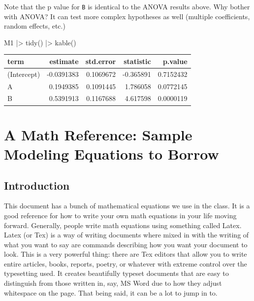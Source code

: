 \documentclass[
  letterpaper,
  DIV=11,
  numbers=noendperiod]{scrreprt}
\newenvironment{Shaded}{\begin{snugshade}}{\end{snugshade}}
\newcommand{\FunctionTok}[1]{\textcolor[rgb]{0.02,0.16,0.49}{#1}}
\newcommand{\NormalTok}[1]{\textcolor[rgb]{0.00,0.44,0.13}{#1}}
\newcommand{\SpecialCharTok}[1]{\textcolor[rgb]{0.25,0.44,0.63}{#1}}
\begin{document}
Note that the p value for \texttt{B} is identical to the ANOVA results
above. Why bother with ANOVA? It can test more complex hypotheses as
well (multiple coefficients, random effects, etc.)

\begin{Shaded}
\begin{Highlighting}[]
\NormalTok{M1 }\SpecialCharTok{|\textgreater{}} 
  \FunctionTok{tidy}\NormalTok{() }\SpecialCharTok{|\textgreater{}} 
  \FunctionTok{kable}\NormalTok{()}
\end{Highlighting}
\end{Shaded}

\begin{longtable}[]{@{}lrrrr@{}}
\toprule\noalign{}
term & estimate & std.error & statistic & p.value \\
\midrule\noalign{}
\endhead
\bottomrule\noalign{}
\endlastfoot
(Intercept) & -0.0391383 & 0.1069672 & -0.365891 & 0.7152432 \\
A & 0.1949385 & 0.1091445 & 1.786058 & 0.0772145 \\
B & 0.5391913 & 0.1167688 & 4.617598 & 0.0000119 \\
\end{longtable}

\hypertarget{a-math-reference-sample-modeling-equations-to-borrow}{%
\chapter{A Math Reference: Sample Modeling Equations to
Borrow}\label{a-math-reference-sample-modeling-equations-to-borrow}}

\hypertarget{introduction}{%
\section{Introduction}\label{introduction}}

This document has a bunch of mathematical equations we use in the class.
It is a good reference for how to write your own math equations in your
life moving forward. Generally, people write math equations using
something called Latex. Latex (or Tex) is a way of writing documents
where mixed in with the writing of what you want to say are commands
describing how you want your document to look. This is a very powerful
thing: there are Tex editors that allow you to write entire articles,
books, reports, poetry, or whatever with extreme control over the
typesetting used. It creates beautifully typeset documents that are easy
to distinguish from those written in, say, MS Word due to how they
adjust whitespace on the page. That being said, it can be a lot to jump
in to.
\end{document}
